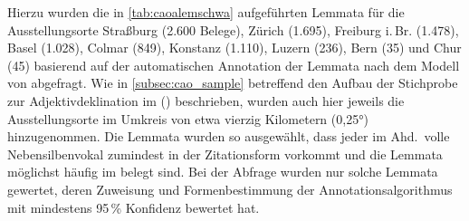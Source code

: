 Hierzu wurden die in \cref{tab:caoalemschwa} aufgeführten Lemmata für die
Ausstellungsorte
Straßburg (2.600 Belege),
% 
Zürich (1.695),
% 
Freiburg i.\,Br. (1.478),
% 
Basel (1.028),
% 
Colmar (849),
% 
Konstanz (1.110),
% 
Luzern (236),
% 
Bern (35)
% 
und Chur (45)
% 
basierend auf der automatischen Annotation der Lemmata nach dem Modell von
\citet{schmid2019} abgefragt. Wie in \cref{subsec:cao_sample} betreffend den
Aufbau der Stichprobe zur Adjektivdeklination im  (\CAO) beschrieben, wurden auch hier jeweils die
Ausstellungsorte im Umkreis von etwa vierzig Kilometern (0,25°) hinzugenommen.
Die Lemmata wurden so ausgewählt, dass jeder im Ahd.\ volle Nebensilbenvokal
zumindest in der Zitationsform vorkommt und die Lemmata möglichst häufig im
\CAO{} belegt sind. Bei der Abfrage wurden nur solche Lemmata gewertet, deren
Zuweisung und Formenbestimmung der Annotations\-algorithmus mit mindestens
95\,\% Konfidenz bewertet hat.

